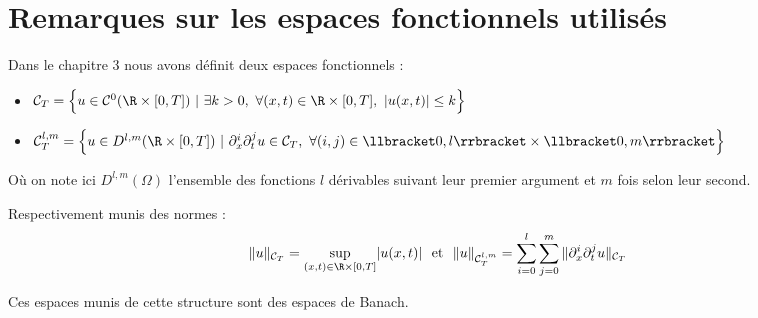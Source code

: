 \appendix
\chapter{Remarques sur les espaces fonctionnels utilisés}

Dans le chapitre 3 nous avons définit deux espaces fonctionnels :

\begin{itemize}
    \item $\mathcal{C}_T = \Big\{ u \in \mathcal{C}^0(\R \times [0,T]) \ | \ \exists k > 0, \ \forall (x,t) \in \R \times [0,T], \ |u(x,t)| \leq k \Big\}$
    \item $\mathcal{C}^{l,m}_T =  \Big\{ u \in D^{l,m}(\R \times [0,T]) \ | \ \partial_x^i \partial_t^j u \in \mathcal{C}_T, \ \forall (i,j) \in \llbracket 0,l \rrbracket \times \llbracket 0,m \rrbracket \Big\}$
\end{itemize}
Où on note ici $D^{l,m}(\Omega)$ l'ensemble des fonctions $l$ dérivables suivant leur premier argument et $m$ fois selon leur second.
\vspace{1em}

Respectivement munis des normes :
$$\|u\|_{\mathcal{C}_T} = \underset{(x,t)\in \R \times [0,T]}{\sup}|u(x,t)| \ \text{ et } \ \| u \|_{\mathcal{C}^{l,m}_T} = \sum_{i=0}^{l} \sum_{j=0}^{m} \| \partial_x^i \partial_t^j u \|_{\mathcal{C}_T} $$

Ces espaces munis de cette structure sont des espaces de Banach. 

